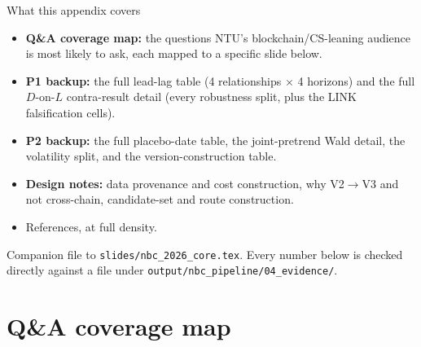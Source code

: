 \documentclass[aspectratio=169]{beamer}
\begin{document}
\begin{frame}{What this appendix covers}
  \begin{itemize}
    \item \textbf{Q\&A coverage map:} the questions NTU's blockchain/CS-leaning audience is most likely to ask, each mapped to a specific slide below.
    \item \textbf{P1 backup:} the full lead-lag table (4 relationships $\times$ 4 horizons) and the full $D$-on-$L$ contra-result detail (every robustness split, plus the LINK falsification cells).
    \item \textbf{P2 backup:} the full placebo-date table, the joint-pretrend Wald detail, the volatility split, and the version-construction table.
    \item \textbf{Design notes:} data provenance and cost construction, why V2$\to$V3 and not cross-chain, candidate-set and route construction.
    \item References, at full density.
  \end{itemize}
  {\scriptsize Companion file to \texttt{slides/nbc\_2026\_core.tex}. Every number below is checked directly against a file under \texttt{output/nbc\_pipeline/04\_evidence/}.}
\end{frame}

\section{Q\&A coverage map}
\end{document}
